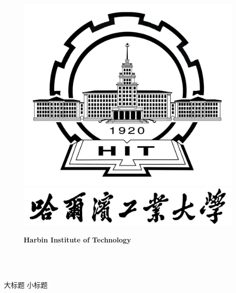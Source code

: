 \documentclass[UTF8]{elegantpaper}
\begin{document}
\thispagestyle{empty}
\begin{figure}[t]
	\parbox[b]{2cm}{
		\includegraphics[scale=0.22]{HIT.jpg} %
	}
	\parbox[b]{13.5cm}{
		\begin{center}
			\includegraphics[scale=0.8]{hitname.jpg} 
			
			\large \textbf{Harbin Institute of Technology} 
		\end{center}
	}
\end{figure}

\begin{center}
	\quad \\
	\quad \\
	\quad \\
	\heiti \fontsize{30}{12pt} 大标题 %
	\vskip 2.5cm
	\heiti {} 小标题 %
\end{center}
\vskip 6cm
\end{document}
